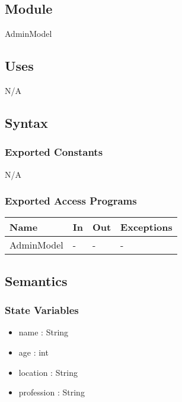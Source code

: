 \documentclass[12pt, titlepage]{article}
\begin{document}
\subsection{Module}

AdminModel

\subsection{Uses}

N/A

\subsection{Syntax}

\subsubsection{Exported Constants}

N/A

\subsubsection{Exported Access Programs}

\begin{center}
\begin{tabular}{p{3cm} p{4cm} p{4cm} p{3.5cm}}
\hline
\textbf{Name} & \textbf{In} & \textbf{Out} & \textbf{Exceptions} \\
\hline
AdminModel & - & - & - \\ 
\hline
\end{tabular}
\end{center}

\subsection{Semantics}

\subsubsection{State Variables}

\begin{itemize}
    \item name : String
    \item age : int
    \item location : String
    \item profession : String
\end{itemize}
\end{document}
